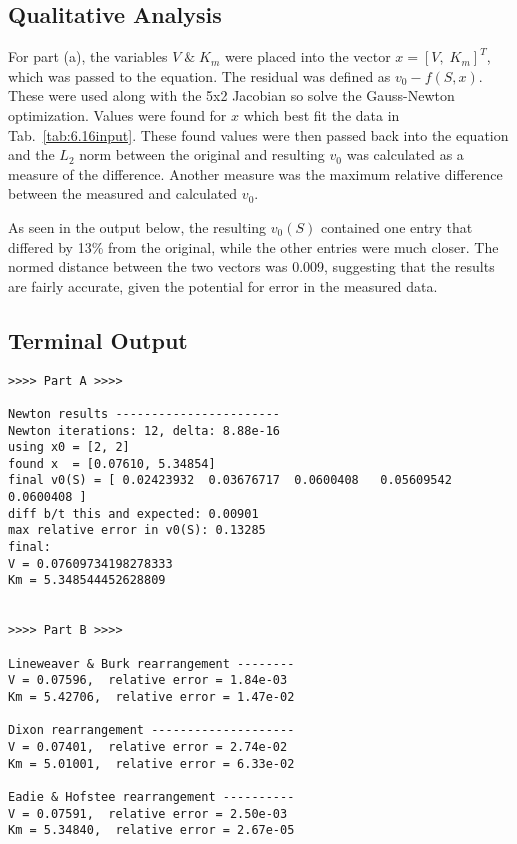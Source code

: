\documentclass[paper=a4, fontsize=11pt]{scrartcl}
\numberwithin{equation}{section}		%
\numberwithin{figure}{section}			%
\numberwithin{table}{section}				%
\begin{document}
\vspace{4mm}
\subsection{Qualitative Analysis}
\par For part (a), the variables $V \; \& \; K_m$ were placed into the vector $x = [V, \; K_m]^T$, which was passed to the equation. The residual was defined as $v_0 - f(S, x)$. These were used along with the 5x2 Jacobian so solve the Gauss-Newton optimization. Values were found for $x$ which best fit the data in Tab.~\ref{tab:6.16input}. These found values were then passed back into the equation and the $L_2$ norm between the original and resulting $v_0$ was calculated as a measure of the difference. Another measure was the maximum relative difference between the measured and calculated $v_0$. \\
\par As seen in the output below, the resulting $v_0(S)$ contained one entry that differed by 13\% from the original, while the other entries were much closer. The normed distance between the two vectors was 0.009, suggesting that the results are fairly accurate, given the potential for error in the measured data. \\

\vspace{4mm}
\subsection{Terminal Output}
\begin{verbatim}
>>>> Part A >>>>

Newton results -----------------------
Newton iterations: 12, delta: 8.88e-16
using x0 = [2, 2]
found x  = [0.07610, 5.34854]
final v0(S) = [ 0.02423932  0.03676717  0.0600408   0.05609542  0.0600408 ]
diff b/t this and expected: 0.00901
max relative error in v0(S): 0.13285
final:
V = 0.07609734198278333
Km = 5.348544452628809


>>>> Part B >>>>

Lineweaver & Burk rearrangement --------
V = 0.07596,  relative error = 1.84e-03
Km = 5.42706,  relative error = 1.47e-02

Dixon rearrangement --------------------
V = 0.07401,  relative error = 2.74e-02
Km = 5.01001,  relative error = 6.33e-02

Eadie & Hofstee rearrangement ----------
V = 0.07591,  relative error = 2.50e-03
Km = 5.34840,  relative error = 2.67e-05
\end{verbatim}
\end{document}
